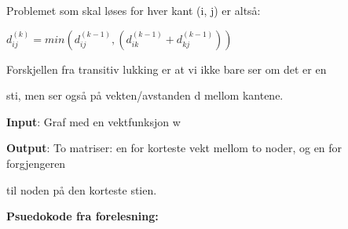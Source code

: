 \documentclass[12pt]{report}
\begin{document}
\setlength{\parskip}{0.0pt}
Problemet som skal løses for hver kant (i, j) er altså:\par

  \( d_{ij}^{ \left( k \right) }= min⁡ \left( d_{ij}^{ \left( k-1 \right) },  \left( d_{ik}^{ \left( k-1 \right) }+d_{kj}^{ \left( k-1 \right) } \right)  \right)   \) \par

Forskjellen fra transitiv lukking er at vi ikke bare ser om det er en \par

sti, men ser også på vekten/avstanden d mellom kantene.\par


\vspace{\baselineskip}
\textbf{Input}: Graf med en vektfunksjon w\par

\textbf{Output}: To matriser: en for korteste vekt mellom to noder, og en for forgjengeren \par

til noden på den korteste stien.\par


\vspace{\baselineskip}
\setlength{\parskip}{10.56pt}
{\fontsize{13pt}{15.6pt}\selectfont \textbf{Psuedokode fra forelesning:}\par}\par
\end{document}
